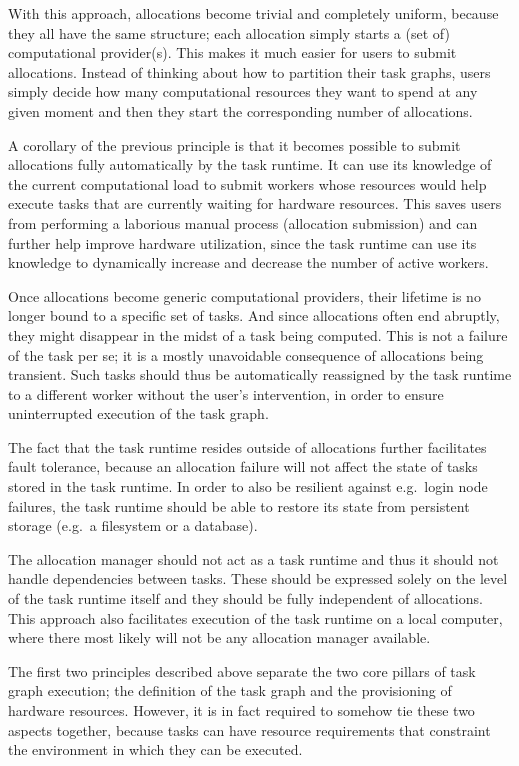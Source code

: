 \begin{description}[wide=0pt]
		With this approach, allocations become trivial and completely uniform, because they all have the
		same structure; each allocation simply starts a (set of) computational provider(s). This makes it
		much easier for users to submit allocations. Instead of thinking about how to partition their task
		graphs, users simply decide how many computational resources they want to spend at any given moment
		and then they start the corresponding number of allocations.
	\item[Allocations are submittable automatically] A corollary of the previous principle is that it becomes possible to submit allocations fully
		automatically by the task runtime. It can use its knowledge of the current computational load to
		submit workers whose resources would help execute tasks that are currently waiting for hardware
		resources. This saves users from performing a laborious manual process (allocation submission) and
		can further help improve hardware utilization, since the task runtime can use its knowledge to
		dynamically increase and decrease the number of active workers.
	\item[Failed tasks are retried automatically] Once allocations become generic computational providers, their lifetime is no longer bound to a
		specific set of tasks. And since allocations often end abruptly, they might disappear in the midst
		of a task being computed. This is not a failure of the task per se; it is a mostly unavoidable
		consequence of allocations being transient. Such tasks should thus be automatically reassigned by
		the task runtime to a different worker without the user's intervention, in order to ensure
		uninterrupted execution of the task graph.

		The fact that the task runtime resides outside of allocations further facilitates fault tolerance,
		because an allocation failure will not affect the state of tasks stored in the task runtime. In
		order to also be resilient against e.g.\ login node failures, the task runtime should be able to
		restore its state from persistent storage (e.g.\ a filesystem or a database).
	\item[Dependencies are independent of allocations] The allocation manager should not act as a task runtime and thus it should not handle dependencies
		between tasks. These should be expressed solely on the level of the task runtime itself and they
		should be fully independent of allocations. This approach also facilitates execution of the task
		runtime on a local computer, where there most likely will not be any allocation manager available.
	\item[Tasks are paired with workers using abstract resources] The first two principles described above separate the two core pillars of task graph execution; the
		definition of the task graph and the provisioning of hardware resources. However, it is in fact
		required to somehow tie these two aspects together, because tasks can have resource requirements
		that constraint the environment in which they can be executed.


\end{description}
